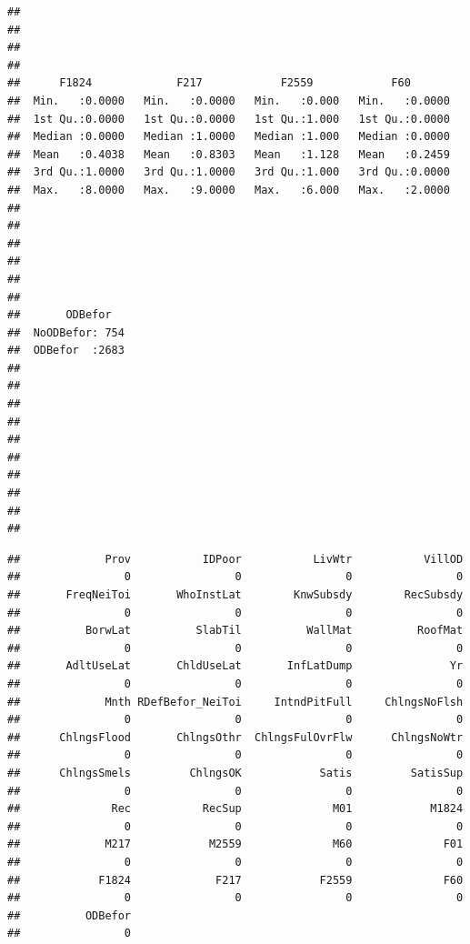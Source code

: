 \documentclass[11pt,]{article}
\begin{document}
\begin{verbatim}
##                                                                     
##                                                                     
##                                                                     
##                                                                     
##      F1824             F217            F2559            F60        
##  Min.   :0.0000   Min.   :0.0000   Min.   :0.000   Min.   :0.0000  
##  1st Qu.:0.0000   1st Qu.:0.0000   1st Qu.:1.000   1st Qu.:0.0000  
##  Median :0.0000   Median :1.0000   Median :1.000   Median :0.0000  
##  Mean   :0.4038   Mean   :0.8303   Mean   :1.128   Mean   :0.2459  
##  3rd Qu.:1.0000   3rd Qu.:1.0000   3rd Qu.:1.000   3rd Qu.:0.0000  
##  Max.   :8.0000   Max.   :9.0000   Max.   :6.000   Max.   :2.0000  
##                                                                    
##                                                                    
##                                                                    
##                                                                    
##                                                                    
##                                                                    
##       ODBefor    
##  NoODBefor: 754  
##  ODBefor  :2683  
##                  
##                  
##                  
##                  
##                  
##                  
##                  
##                  
##                  
## 
\end{verbatim}

\begin{verbatim}
##             Prov           IDPoor           LivWtr           VillOD 
##                0                0                0                0 
##       FreqNeiToi       WhoInstLat        KnwSubsdy        RecSubsdy 
##                0                0                0                0 
##          BorwLat          SlabTil          WallMat          RoofMat 
##                0                0                0                0 
##       AdltUseLat       ChldUseLat       InfLatDump               Yr 
##                0                0                0                0 
##             Mnth RDefBefor_NeiToi     IntndPitFull     ChlngsNoFlsh 
##                0                0                0                0 
##      ChlngsFlood       ChlngsOthr  ChlngsFulOvrFlw      ChlngsNoWtr 
##                0                0                0                0 
##      ChlngsSmels         ChlngsOK            Satis         SatisSup 
##                0                0                0                0 
##              Rec           RecSup              M01            M1824 
##                0                0                0                0 
##             M217            M2559              M60              F01 
##                0                0                0                0 
##            F1824             F217            F2559              F60 
##                0                0                0                0 
##          ODBefor 
##                0
\end{verbatim}
\end{document}
